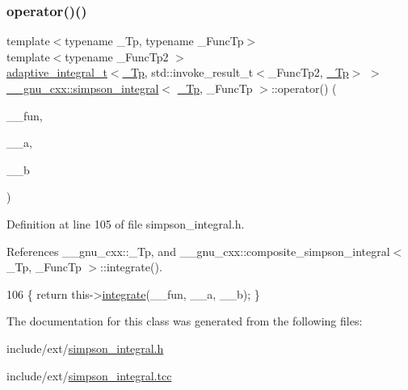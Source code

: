 \subsubsection{\texorpdfstring{operator()()}{operator()()}\hspace{0.1cm}{\footnotesize\ttfamily [2/2]}}
{\footnotesize\ttfamily template$<$typename \+\_\+\+Tp, typename \+\_\+\+Func\+Tp$>$ \\
template$<$typename \+\_\+\+Func\+Tp2 $>$ \\
\hyperlink{struct____gnu__cxx_1_1adaptive__integral__t}{adaptive\+\_\+integral\+\_\+t}$<$\hyperlink{namespace____gnu__cxx_a3b19a9c800ca194374ef9172290f7d79}{\+\_\+\+Tp}, std\+::invoke\+\_\+result\+\_\+t$<$\+\_\+\+Func\+Tp2, \hyperlink{namespace____gnu__cxx_a3b19a9c800ca194374ef9172290f7d79}{\+\_\+\+Tp}$>$ $>$ \hyperlink{class____gnu__cxx_1_1simpson__integral}{\+\_\+\+\_\+gnu\+\_\+cxx\+::simpson\+\_\+integral}$<$ \hyperlink{namespace____gnu__cxx_a3b19a9c800ca194374ef9172290f7d79}{\+\_\+\+Tp}, \+\_\+\+Func\+Tp $>$\+::operator() (\begin{DoxyParamCaption}\item[{\+\_\+\+Func\+Tp2}]{\+\_\+\+\_\+fun,  }\item[{\hyperlink{namespace____gnu__cxx_a3b19a9c800ca194374ef9172290f7d79}{\+\_\+\+Tp}}]{\+\_\+\+\_\+a,  }\item[{\hyperlink{namespace____gnu__cxx_a3b19a9c800ca194374ef9172290f7d79}{\+\_\+\+Tp}}]{\+\_\+\+\_\+b }\end{DoxyParamCaption})\hspace{0.3cm}{\ttfamily [inline]}}



Definition at line 105 of file simpson\+\_\+integral.\+h.



References \+\_\+\+\_\+gnu\+\_\+cxx\+::\+\_\+\+Tp, and \+\_\+\+\_\+gnu\+\_\+cxx\+::composite\+\_\+simpson\+\_\+integral$<$ \+\_\+\+Tp, \+\_\+\+Func\+Tp $>$\+::integrate().


\begin{DoxyCode}
106         \{ \textcolor{keywordflow}{return} this->\hyperlink{class____gnu__cxx_1_1simpson__integral_a201a7dc0f406d2b1afe50d4b13a386ff}{integrate}(\_\_fun, \_\_a, \_\_b); \}
\end{DoxyCode}


The documentation for this class was generated from the following files\+:\begin{DoxyCompactItemize}
\item 
include/ext/\hyperlink{simpson__integral_8h}{simpson\+\_\+integral.\+h}\item 
include/ext/\hyperlink{simpson__integral_8tcc}{simpson\+\_\+integral.\+tcc}\end{DoxyCompactItemize}

